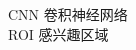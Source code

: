 \begin{preface}
    \begin{tabbing}
        CNN      卷积神经网络 \\
    
        ROI      感兴趣区域 \\
    
    \end{tabbing}
\end{preface}